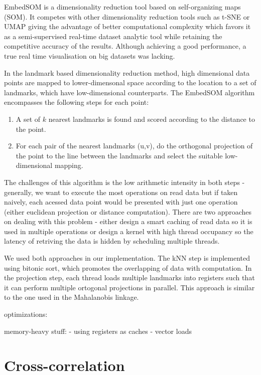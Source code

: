 EmbedSOM is a dimensionality reduction tool based on self-organizing maps (SOM). It competes with other dimensionality reduction tools such as t-SNE or UMAP giving the advantage of better computational complexity which favors it as a semi-supervised real-time dataset analytic tool while retaining the competitive accuracy of the results.
Although achieving a good performance, a true real time visualisation on big datasets was lacking. 

In the landmark based dimensionality reduction method, high dimensional data points are mapped to lower-dimensonal space according to the location to a set of landmarks, which have low-dimensional counterparts.
The EmbedSOM algorithm encompasses the following steps for each point:
\begin{enumerate}
    \item A set of $k$ nearest landmarks is found and scored according to the distance to the point.
    \item For each pair of the nearest landmarks (u,v), do the orthogonal projection of the point to the line between the landmarks and select the suitable low-dimensional mapping.
\end{enumerate}

The challenges of this algorithm is the low arithmetic intensity in both steps - generally, we want to execute the most operations on read data but if taken naively, each acessed data point would be presented with just one operation (either euclidean projection or distance computation).
There are two approaches on dealing with this problem - either design a smart caching of read data so it is used in multiple operations or design a kernel with high thread occupancy so the latency of retriving the data is hidden by scheduling multiple threads.

We used both approaches in our implementation. The kNN step is implemented using bitonic sort, which promotes the overlapping of data with computation. In the projection step, each thread loads multiple landmarks into registers such that it can perform multiple ortogonal projections in parallel. This approach is similar to the one used in the Mahalanobis linkage.

optimizations:

memory-heavy stuff:
- using registers as caches
- vector loads

\section{Cross-correlation}

